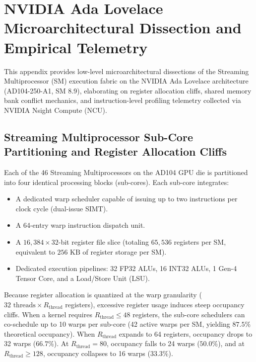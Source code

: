 \section{NVIDIA Ada Lovelace Microarchitectural Dissection and Empirical Telemetry}
\label{sec:appendix_nvidia_ada_dissection}
\label{sec:appendix_empirical_telemetry}

This appendix provides low-level microarchitectural dissections of the Streaming Multiprocessor (SM) execution fabric on the NVIDIA Ada Lovelace architecture (AD104-250-A1, SM 8.9), elaborating on register allocation cliffs, shared memory bank conflict mechanics, and instruction-level profiling telemetry collected via NVIDIA Nsight Compute (NCU).

\subsection{Streaming Multiprocessor Sub-Core Partitioning and Register Allocation Cliffs}
\label{subsec:appendix_sm_partitioning}

Each of the 46 Streaming Multiprocessors on the AD104 GPU die is partitioned into four identical processing blocks (sub-cores). Each sub-core integrates:
\begin{itemize}
    \item A dedicated warp scheduler capable of issuing up to two instructions per clock cycle (dual-issue SIMT).
    \item A 64-entry warp instruction dispatch unit.
    \item A $16{,}384 \times 32$-bit register file slice (totaling $65{,}536$ registers per SM, equivalent to $256\text{ KB}$ of register storage per SM).
    \item Dedicated execution pipelines: 32 FP32 ALUs, 16 INT32 ALUs, 1 Gen-4 Tensor Core, and a Load/Store Unit (LSU).
\end{itemize}

Because register allocation is quantized at the warp granularity ($32\text{ threads} \times R_{\text{thread}}$ registers), excessive register usage induces steep occupancy cliffs. When a kernel requires $R_{\text{thread}} \le 48$ registers, the sub-core schedulers can co-schedule up to 10 warps per sub-core (42 active warps per SM, yielding $87.5\%$ theoretical occupancy). When $R_{\text{thread}}$ expands to 64 registers, occupancy drops to 32 warps ($66.7\%$). At $R_{\text{thread}} = 80$, occupancy falls to 24 warps ($50.0\%$), and at $R_{\text{thread}} \ge 128$, occupancy collapses to 16 warps ($33.3\%$).

